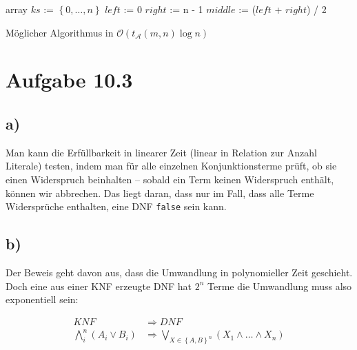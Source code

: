 \documentclass{article}
\begin{document}
\begin{algorithm}
  \DontPrintSemicolon
  array $ks$ := $\left\{0, \dots, n\right\}$\;
  $left$     := 0\;
  $right$    := n - 1\;
  $middle$   := ($left$ + $right$) / 2\;
  \label{alg:2logn}
  \caption{Möglicher Algorithmus in $\mathcal{O}\left(t_\mathcal{A}\left(m,n\right)\log{n}\right)$}
\end{algorithm}



\section*{Aufgabe 10.3}
\subsection*{a)}
Man kann die Erfüllbarkeit in linearer Zeit (linear in Relation zur Anzahl Literale) testen, indem man für alle einzelnen Konjunktionsterme prüft, ob sie einen Widerspruch beinhalten -- sobald ein Term keinen Widerspruch enthält, können wir abbrechen. Das liegt daran, dass nur im Fall, dass alle Terme Widersprüche enthalten, eine DNF \texttt{false} sein kann.

\subsection*{b)}
Der Beweis geht davon aus, dass die Umwandlung in polynomieller Zeit geschieht. Doch eine aus einer KNF erzeugte DNF hat $2^n$ Terme die Umwandlung muss also exponentiell sein:

\begin{align*}
KNF &\Rightarrow DNF \\
\bigwedge\limits_i^n \left(A_i \vee B_i\right) &\Rightarrow \bigvee\limits_{X\in\left\{A,B\right\}^n} \left(X_1 \wedge \dots \wedge X_n\right)
\end{align*}
\end{document}
